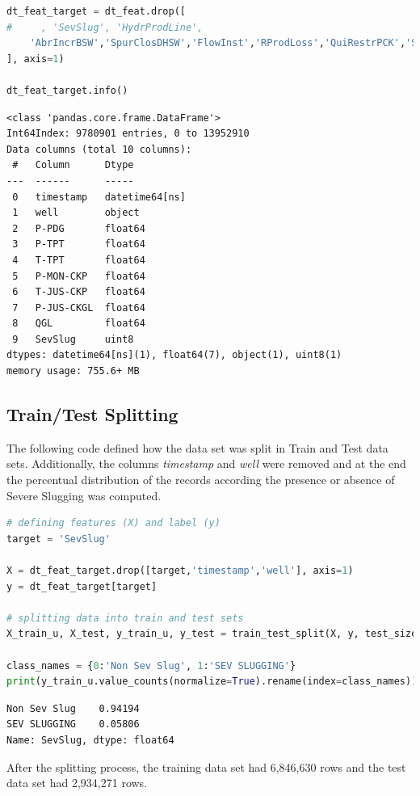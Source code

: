 \documentclass{article}
\begin{document}
\begin{lstlisting}[language=Python]
dt_feat_target = dt_feat.drop([
#     , 'SevSlug', 'HydrProdLine',
    'AbrIncrBSW','SpurClosDHSW','FlowInst','RProdLoss','QuiRestrPCK','ScalingPCK'
], axis=1)

dt_feat_target.info()
\end{lstlisting}
\begin{verbatim}
<class 'pandas.core.frame.DataFrame'>
Int64Index: 9780901 entries, 0 to 13952910
Data columns (total 10 columns):
 #   Column      Dtype         
---  ------      -----         
 0   timestamp   datetime64[ns]
 1   well        object        
 2   P-PDG       float64       
 3   P-TPT       float64       
 4   T-TPT       float64       
 5   P-MON-CKP   float64       
 6   T-JUS-CKP   float64       
 7   P-JUS-CKGL  float64       
 8   QGL         float64       
 9   SevSlug     uint8         
dtypes: datetime64[ns](1), float64(7), object(1), uint8(1)
memory usage: 755.6+ MB
\end{verbatim}

\subsection{Train/Test Splitting}

The following code defined how the data set was split in Train and Test data sets. Additionally, the columns \emph{timestamp} and \emph{well} were removed and at the end the percentual distribution of the records according the presence or absence of Severe Slugging was computed.

\begin{lstlisting}[language=Python]
# defining features (X) and label (y)
target = 'SevSlug'

X = dt_feat_target.drop([target,'timestamp','well'], axis=1)
y = dt_feat_target[target]

# splitting data into train and test sets
X_train_u, X_test, y_train_u, y_test = train_test_split(X, y, test_size=0.3, random_state=42)

class_names = {0:'Non Sev Slug', 1:'SEV SLUGGING'}
print(y_train_u.value_counts(normalize=True).rename(index=class_names))
\end{lstlisting}
\begin{verbatim}
Non Sev Slug    0.94194
SEV SLUGGING    0.05806
Name: SevSlug, dtype: float64
\end{verbatim}

After the splitting process, the training data set had 6,846,630 rows and the test data set had 2,934,271 rows.
\end{document}

